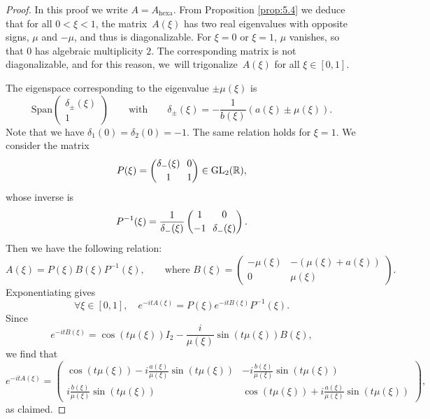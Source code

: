 \documentclass[10pt]{amsart}
\theoremstyle{definition}
\newcommand\R{\mathbb R}
\begin{document}
\begin{proof}
In this proof we write $A=A_{\mathrm{hexa}}$. From Proposition \ref{prop:5.4} we deduce that for all ${0 < \xi < 1}$, the matrix~$A(\xi)$ has two real eigenvalues with opposite signs, $\mu$ and $-\mu$, and thus is diagonalizable. For $\xi =0$ or $\xi = 1$, $\mu$ vanishes, so that $0$ has algebraic multiplicity $2$. The corresponding matrix is not diagonalizable, and for this reason, we~will trigonalize~$A(\xi)$ for all $\xi \in [0,1]$.

The eigenspace corresponding to the eigenvalue $\pm \mu(\xi)$ is
\[
\text{Span}\begin{pmatrix} \delta_{\pm}(\xi) \\[2pt] 1 \end{pmatrix} \qquad \text{with} \qquad
\delta_{\pm}(\xi) = -\frac{1}{b(\xi)}(a(\xi) \pm \mu(\xi)).
\]
Note that we have $\delta_1(0) = \delta_2(0) = -1$. The same relation holds for $\xi = 1$.
We consider the matrix
\[\arraycolsep3.5pt
P(\xi) = \begin{pmatrix} \delta_-(\xi) & 0 \\[2pt] 1 & 1 \end{pmatrix} \in \mathrm{GL}_2(\R),
\]
whose inverse is
\[\arraycolsep3.5pt
P^{-1}(\xi) = \frac{1}{\delta_-(\xi)} \begin{pmatrix} 1 & 0 \\[2pt] -1 & \delta_-(\xi) \end{pmatrix}.
\]
Then we have the following relation:
\begin{equation}\label{tridiag_A}
A(\xi) = P(\xi)B(\xi) P^{-1}(\xi), \qquad \text{where }
B(\xi) = \begin{pmatrix} -\mu(\xi) & -(\mu(\xi)+a(\xi)) \\[2pt] 0 & \mu(\xi) \end{pmatrix}.
\end{equation}
Exponentiating gives
\begin{equation*}
\forall \xi\in[0,1], \quad e^{-itA(\xi)} = P(\xi)e^{-itB(\xi)} P^{-1}(\xi).
\end{equation*}
Since
\begin{equation*}
e^{-itB(\xi)} = \cos(t\mu(\xi)) I_2 - \frac{i}{\mu(\xi)}\sin(t\mu(\xi)) B(\xi),
\end{equation*}
we find that
\begin{equation*}
e^{-itA(\xi)} = \begin{pmatrix} \cos(t\mu(\xi)) - i\frac{a(\xi)}{\mu(\xi)}\sin(t\mu(\xi)) & -i\frac{b(\xi)}{\mu(\xi)}\sin(t\mu(\xi)) \\[6pt] i\frac{b(\xi)}{\mu(\xi)}\sin(t\mu(\xi)) & \cos(t\mu(\xi)) + i\frac{a(\xi)}{\mu(\xi)}\sin(t\mu(\xi)) \end{pmatrix},
\end{equation*}
as claimed.
\end{proof}
\end{document}
